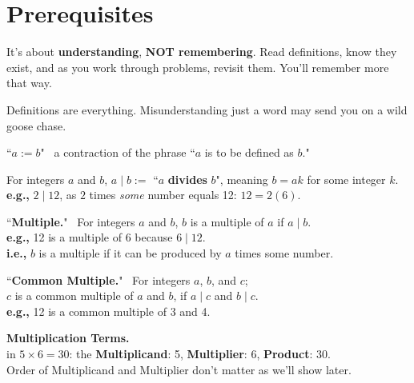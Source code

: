 \section{Prerequisites}
\begin{note}
    It's about \textbf{understanding}, \textbf{NOT remembering}. Read definitions, know they exist, and as you work through problems, revisit them. You'll remember more that way.
\end{note}
Definitions are everything. Misunderstanding just a word may send you on a wild goose chase.\\

\begin{definition}
    ``$a := b$" \ a contraction of the phrase ``$a$ is to be defined as $b$."  
\end{definition}

\begin{definition}
    For integers $a$ and $b$, $a \mid b:=$ ``$a$ \textbf{divides} $b$",  
    meaning $b = ak$ for some integer $k$.
    \textbf{e.g.,} $2 \mid 12$, as $2$ times \textit{some} number equals 12: $12 = 2(6)$.
\end{definition}

\begin{definition} 
    ``\textbf{Multiple.}" \ For integers $a$ and $b$, $b$ is a multiple of $a$ if $a \mid b$.\\
    \textbf{e.g.,} 12 is a multiple of 6 because $6 \mid 12$.\\
    \textbf{i.e.,} $b$ is a multiple if it can be produced by $a$ times some number.
\end{definition}

\begin{definition}
    ``\textbf{Common Multiple.}" \ For integers $a$, $b$, and $c$;\\
    $c$ is a common multiple of $a$ and $b$, if $a \mid c$ and $b \mid c$.\\
    \textbf{e.g.,} 12 is a common multiple of 3 and 4.
\end{definition}

\begin{definition}
    \textbf{Multiplication Terms.} \\ in $5\times6=30$: the
    \textbf{Multiplicand}: 5,
    \textbf{Multiplier}: 6,
    \textbf{Product}: 30.\\
    Order of Multiplicand and Multiplier don't matter as we'll show later.
\end{definition}


